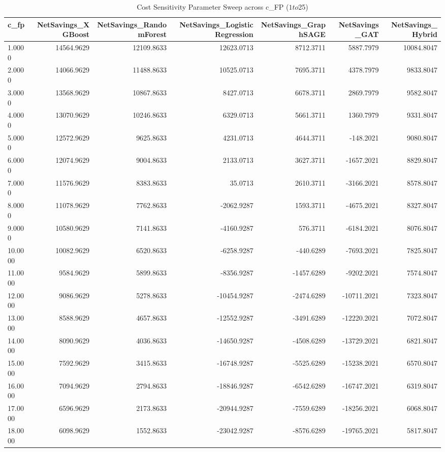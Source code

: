 \begin{table}
\caption{Cost Sensitivity Parameter Sweep across c_FP ($1 to $25)}
\label{tab:cost_sensitivity_sweep}
\begin{tabular}{lrrrrrr}
\toprule
c_fp & NetSavings_XGBoost & NetSavings_RandomForest & NetSavings_LogisticRegression & NetSavings_GraphSAGE & NetSavings_GAT & NetSavings_Hybrid \\
\midrule
1.0000 & 14564.9629 & 12109.8633 & 12623.0713 & 8712.3711 & 5887.7979 & 10084.8047 \\
2.0000 & 14066.9629 & 11488.8633 & 10525.0713 & 7695.3711 & 4378.7979 & 9833.8047 \\
3.0000 & 13568.9629 & 10867.8633 & 8427.0713 & 6678.3711 & 2869.7979 & 9582.8047 \\
4.0000 & 13070.9629 & 10246.8633 & 6329.0713 & 5661.3711 & 1360.7979 & 9331.8047 \\
5.0000 & 12572.9629 & 9625.8633 & 4231.0713 & 4644.3711 & -148.2021 & 9080.8047 \\
6.0000 & 12074.9629 & 9004.8633 & 2133.0713 & 3627.3711 & -1657.2021 & 8829.8047 \\
7.0000 & 11576.9629 & 8383.8633 & 35.0713 & 2610.3711 & -3166.2021 & 8578.8047 \\
8.0000 & 11078.9629 & 7762.8633 & -2062.9287 & 1593.3711 & -4675.2021 & 8327.8047 \\
9.0000 & 10580.9629 & 7141.8633 & -4160.9287 & 576.3711 & -6184.2021 & 8076.8047 \\
10.0000 & 10082.9629 & 6520.8633 & -6258.9287 & -440.6289 & -7693.2021 & 7825.8047 \\
11.0000 & 9584.9629 & 5899.8633 & -8356.9287 & -1457.6289 & -9202.2021 & 7574.8047 \\
12.0000 & 9086.9629 & 5278.8633 & -10454.9287 & -2474.6289 & -10711.2021 & 7323.8047 \\
13.0000 & 8588.9629 & 4657.8633 & -12552.9287 & -3491.6289 & -12220.2021 & 7072.8047 \\
14.0000 & 8090.9629 & 4036.8633 & -14650.9287 & -4508.6289 & -13729.2021 & 6821.8047 \\
15.0000 & 7592.9629 & 3415.8633 & -16748.9287 & -5525.6289 & -15238.2021 & 6570.8047 \\
16.0000 & 7094.9629 & 2794.8633 & -18846.9287 & -6542.6289 & -16747.2021 & 6319.8047 \\
17.0000 & 6596.9629 & 2173.8633 & -20944.9287 & -7559.6289 & -18256.2021 & 6068.8047 \\
18.0000 & 6098.9629 & 1552.8633 & -23042.9287 & -8576.6289 & -19765.2021 & 5817.8047 \\

\end{tabular}
\end{table}

